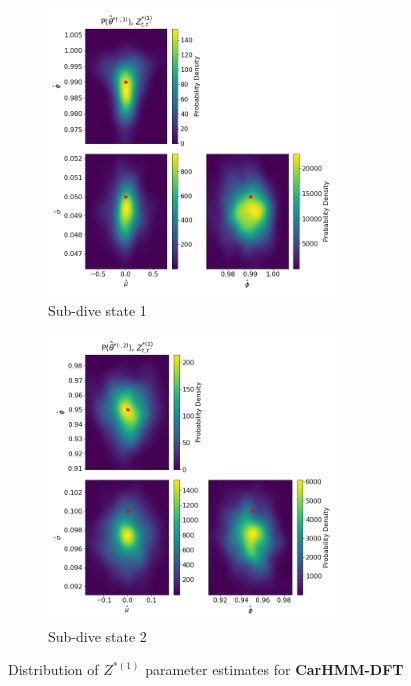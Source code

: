 \documentclass[12pt]{TD-CJS}
\begin{document}
\begin{figure}[ht]
	\centering
	\begin{subfigure}[t]{\textwidth}
        \centering
        \includegraphics[height=3in]{../Plots/hmm_FV_MLE_density_A_0_0.png}
        \caption{Sub-dive state 1}
    \end{subfigure}
    \newline
    \begin{subfigure}[t]{\textwidth}
        \centering
        \includegraphics[height=3in]{../Plots/hmm_FV_MLE_density_A_0_1.png}
        \caption{Sub-dive state 2}
    \end{subfigure}
    \caption{Distribution of $Z^{*(1)}$ parameter estimates for \textbf{CarHMM-DFT}}
\end{figure}
\end{document}
